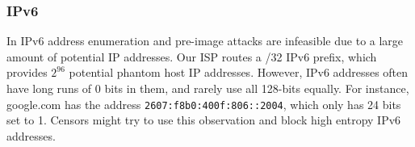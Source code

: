 \documentclass[sigconf]{acmart}
\begin{document}






\subsubsection{IPv6}
\FigIpBits

In IPv6 \scheme address enumeration and pre-image attacks are infeasible due to a large amount of
potential IP addresses.
Our ISP routes a /32 IPv6 prefix, which provides $2^{96}$ potential
phantom host IP addresses. However, IPv6 addresses often have long runs of 0
bits in them, and rarely use all 128-bits equally.
For instance, google.com has the address
\texttt{2607:f8b0:400f:806::2004}, which only has 24 bits set to 1.
Censors might try to use this observation and block high entropy IPv6 addresses.
\end{document}
